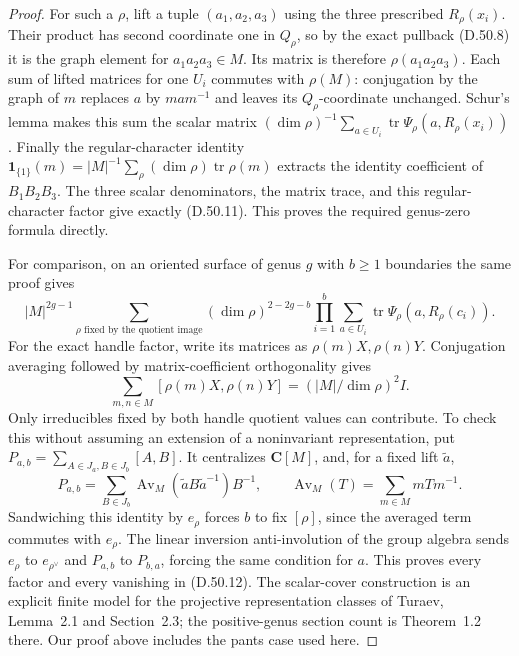 \begin{proof}
For such a \(\rho\), lift a tuple \((a_1,a_2,a_3)\) using
the three prescribed \(R_\rho(x_i)\). Their product has second
coordinate one in \(Q_\rho\), so by the exact pullback
\textup{(D.50.8)} it is the graph element for
\(a_1a_2a_3\in M\). Its matrix is therefore
\(\rho(a_1a_2a_3)\).
Each sum of lifted matrices for one \(U_i\) commutes with
\(\rho(M)\): conjugation by the graph of \(m\) replaces
\(a\) by \(mam^{-1}\) and leaves its \(Q_\rho\)-coordinate
unchanged. Schur's lemma makes this sum the scalar matrix
\((\dim\rho)^{-1}\sum_{a\in U_i}
\operatorname{tr}\Psi_\rho(a,R_\rho(x_i))\).
Finally the regular-character identity
\(\mathbf1_{\{1\}}(m)=|M|^{-1}\sum_\rho
(\dim\rho)\operatorname{tr}\rho(m)\)
extracts the identity coefficient of \(B_1B_2B_3\).
The three scalar denominators, the matrix trace, and this
regular-character factor give exactly \textup{(D.50.11)}.
This proves the required genus-zero formula directly.

For comparison, on an oriented surface of genus \(g\) with
\(b\geq1\) boundaries the same proof gives
\[
 |M|^{2g-1}
 \sum_{\rho\text{ fixed by the quotient image}}
   (\dim\rho)^{2-2g-b}
   \prod_{i=1}^b\sum_{a\in U_i}
                    \operatorname{tr}\Psi_\rho(a,R_\rho(c_i)).
 \tag{D.50.12}
\]
For the exact handle factor, write its matrices as
\(\rho(m)X,\rho(n)Y\). Conjugation averaging followed by
matrix-coefficient orthogonality gives
\[
 \sum_{m,n\in M}[\rho(m)X,\rho(n)Y]
                  =(|M|/\dim\rho)^2I.
 \tag{D.50.13}
\]
Only irreducibles fixed by both handle quotient values can
contribute. To check this without assuming an extension of
a noninvariant representation, put
\(P_{a,b}=\sum_{A\in J_a,B\in J_b}[A,B]\).
It centralizes \(\mathbf C[M]\), and, for a fixed lift \(\widetilde a\),
\[
 P_{a,b}=\sum_{B\in J_b}
    \operatorname{Av}_M(\widetilde aB\widetilde a^{-1})B^{-1},
 \qquad \operatorname{Av}_M(T)=\sum_{m\in M}mTm^{-1}.
 \tag{D.50.14}
\]
Sandwiching this identity by \(e_\rho\) forces \(b\) to fix
\([\rho]\), since the averaged term commutes with \(e_\rho\).
The linear inversion anti-involution of the group algebra sends
\(e_\rho\) to \(e_{\rho^\vee}\) and \(P_{a,b}\) to \(P_{b,a}\),
forcing the same condition for \(a\).
This proves every factor and every vanishing in
\textup{(D.50.12)}. The scalar-cover construction is an explicit
finite model for the projective representation classes of
Turaev, Lemma~2.1 and Section~2.3; the positive-genus section
count is Theorem~1.2 there. Our proof above includes the pants
case used here.\cite{ATuraev2009}


\end{proof}

